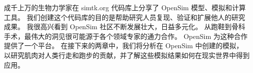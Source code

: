 成千上万的生物力学家在 simtk.org 代码库上分享了 OpenSim 模型、模拟和计算工具。
我们创建这个代码库的目的是帮助研究人员复现、验证和扩展他人的研究成果。
我很高兴看到 OpenSim 社区不断发展壮大，日益多元化。
从跑鞋到骨科手术，最伟大的洞见很可能源于各个领域专家的通力合作。
OpenSim 为这种合作提供了一个平台。
在接下来的两章中，我们将分析在 OpenSim 中创建的模拟，以研究肌肉对人类行走和跑步的贡献，并了解这些模拟结果如何在现实世界中得到应用。



























